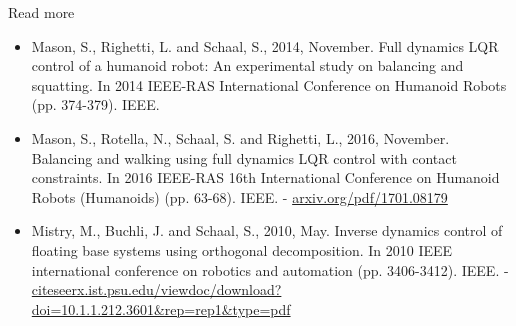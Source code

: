 \documentclass{beamer}
\begin{document}
\begin{frame}{Read more}

\begin{itemize}
\item Mason, S., Righetti, L. and Schaal, S., 2014, November. Full dynamics LQR control of a humanoid robot: An experimental study on balancing and squatting. In 2014 IEEE-RAS International Conference on Humanoid Robots (pp. 374-379). IEEE.

\item Mason, S., Rotella, N., Schaal, S. and Righetti, L., 2016, November. Balancing and walking using full dynamics LQR control with contact constraints. In 2016 IEEE-RAS 16th International Conference on Humanoid Robots (Humanoids) (pp. 63-68). IEEE. - \href{https://arxiv.org/pdf/1701.08179}{arxiv.org/pdf/1701.08179}

\item Mistry, M., Buchli, J. and Schaal, S., 2010, May. Inverse dynamics control of floating base systems using orthogonal decomposition. In 2010 IEEE international conference on robotics and automation (pp. 3406-3412). IEEE. - \href{http://citeseerx.ist.psu.edu/viewdoc/download?doi=10.1.1.212.3601&rep=rep1&type=pdf}{citeseerx.ist.psu.edu/viewdoc/download?doi=10.1.1.212.3601\&rep=rep1\&type=pdf}
\end{itemize}

\end{frame}




\end{document}
